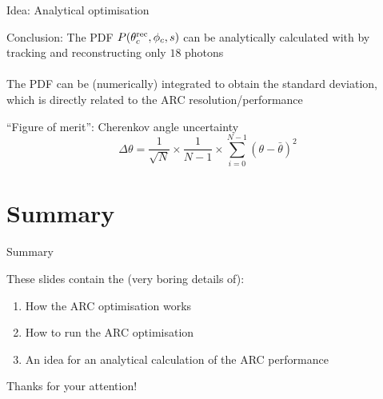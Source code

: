 \documentclass{beamer}
\begin{document}
\begin{frame}{Idea: Analytical optimisation}
  \begin{center}
    Conclusion: The PDF $P(\theta_c^{\rm rec}, \phi_c, s)$ can be analytically calculated with by tracking and reconstructing only $18$ photons \\~\\
    The PDF can be (numerically) integrated to obtain the standard deviation, which is directly related to the ARC resolution/performance
  \end{center}
  \begin{block}{``Figure of merit'': Cherenkov angle uncertainty}
    \begin{equation*}
      \Delta\theta = \frac{1}{\sqrt{N}}\times\frac{1}{N - 1}\times\sum_{i = 0}^{N - 1}(\theta - \bar{\theta})^2
    \end{equation*}
  \end{block}
\end{frame}

\section{Summary}
\begin{frame}{Summary}
  \begin{center}
    {\Large These slides contain the (very boring details of):}
  \end{center}
  \begin{enumerate}
    \setlength\itemsep{1.0em}
    \item{How the ARC optimisation works}
    \item{How to run the ARC optimisation}
    \item{An idea for an analytical calculation of the ARC performance}
  \end{enumerate}
  \vspace{0.5cm}
  \begin{center}
    \huge Thanks for your attention!
  \end{center}
\end{frame}
\end{document}
